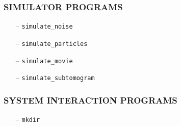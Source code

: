 \documentclass[a4paper,11pt]{article}
\newcommand{\prgname}[1]{\textcolor{NavyBlue}{\texttt{#1}}}
\begin{document}
\subsubsection{SIMULATOR PROGRAMS}
\begin{itemize}
\item[--] \prgname{simulate\_noise}
\item[--] \prgname{simulate\_particles}
\item[--] \prgname{simulate\_movie}
\item[--] \prgname{simulate\_subtomogram}
\end{itemize}

\subsubsection{SYSTEM INTERACTION PROGRAMS}
\begin{itemize}
\item[--] \prgname{mkdir}
\end{itemize}
\end{document}
